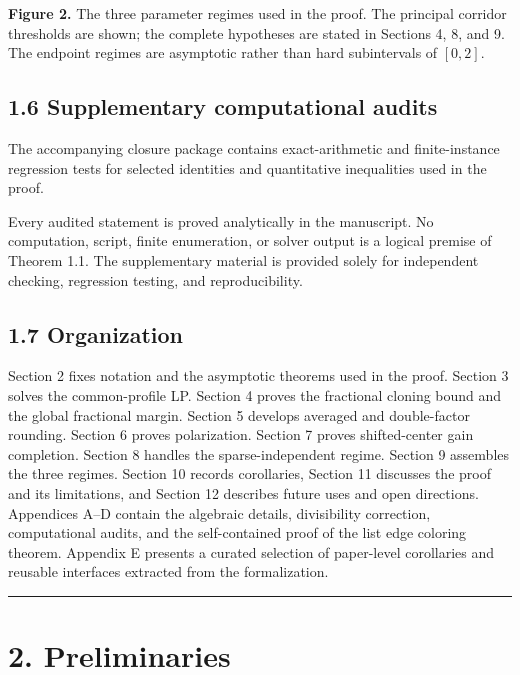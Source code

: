 \documentclass[
  american,
  11pt,
  a4paper,
]{article}
\begin{document}
\textbf{Figure 2.} The three parameter regimes used in the proof. The principal corridor thresholds are shown; the complete hypotheses are stated in Sections 4, 8, and 9. The endpoint regimes are asymptotic rather than hard subintervals of \([0,2]\).

\subsection{1.6 Supplementary computational audits}\label{supplementary-computational-audits}

The accompanying closure package contains exact-arithmetic and finite-instance regression tests for selected identities and quantitative inequalities used in the proof.

Every audited statement is proved analytically in the manuscript. No computation, script, finite enumeration, or solver output is a logical premise of Theorem 1.1. The supplementary material is provided solely for independent checking, regression testing, and reproducibility.

\subsection{1.7 Organization}\label{organization}

Section 2 fixes notation and the asymptotic theorems used in the proof. Section 3 solves the common-profile LP. Section 4 proves the fractional cloning bound and the global fractional margin. Section 5 develops averaged and double-factor rounding. Section 6 proves polarization. Section 7 proves shifted-center gain completion. Section 8 handles the sparse-independent regime. Section 9 assembles the three regimes. Section 10 records corollaries, Section 11 discusses the proof and its limitations, and Section 12 describes future uses and open directions. Appendices A--D contain the algebraic details, divisibility correction, computational audits, and the self-contained proof of the list edge coloring theorem. Appendix E presents a curated selection of paper-level corollaries and reusable interfaces extracted from the formalization.

\begin{center}\rule{0.5\linewidth}{0.5pt}\end{center}

\section{2. Preliminaries}\label{preliminaries}
\end{document}
